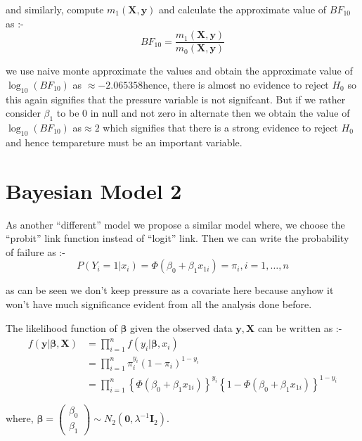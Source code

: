 \documentclass[11pt,english]{article}\usepackage[]{graphicx}\usepackage[]{xcolor}
\begin{document}
and similarly, compute $m_{1}\left(\boldsymbol{X,y}\right)$ and calculate
the approximate value of $BF_{10}$ as :-
\[
BF_{10}=\frac{m_{1}\left(\boldsymbol{X,y}\right)}{m_{0}\left(\boldsymbol{X,y}\right)}
\]

we use naive monte approximate the values and obtain the approximate
value of $\log_{10}\left(BF_{10}\right)$ as $\approx-2.065358$hence,
there is almost no evidence to reject $H_{0}$ so this again signifies
that the pressure variable is not signifcant. But if we rather consider
$\beta_{1}$ to be $0$ in null and not zero in alternate then we
obtain the value of $\log_{10}\left(BF_{10}\right)$ as$\approx2$
which signifies that there is a strong evidence to reject $H_{0}$
and hence tempareture must be an important variable.
\author{\pagebreak}

\section*{Bayesian Model 2}

As another ``different'' model we propose a similar model where,
we choose the ``probit'' link function instead of ``logit'' link.
Then we can write the probability of failure as :-
\[
P\left(Y_{i}=1|x_{i}\right)=\Phi\left(\beta_{0}+\beta_{1}x_{1i}\right)=\pi_{i},i=1,\dots,n
\]

as can be seen we don't keep pressure as a covariate here because
anyhow it won't have much significance evident from all the analysis
done before.

The likelihood function of $\boldsymbol{\beta}$ given the observed
data $\boldsymbol{y,X}$ can be written as :-
\begin{align*}
f\left(\boldsymbol{y}|\boldsymbol{\beta},\boldsymbol{X}\right) & =\prod_{i=1}^{n}f\left(y_{i}|\boldsymbol{\beta},x_{i}\right)\\
 & =\prod_{i=1}^{n}\pi_{i}^{y_{i}}\left(1-\pi_{i}\right)^{1-y_{i}}\\
 & =\prod_{i=1}^{n}\left\{ \Phi\left(\beta_{0}+\beta_{1}x_{1i}\right)\right\} ^{y_{i}}\left\{ 1-\Phi\left(\beta_{0}+\beta_{1}x_{1i}\right)\right\} ^{1-y_{i}}
\end{align*}

where, $\boldsymbol{\beta}=\begin{pmatrix}\beta_{0}\\
\beta_{1}
\end{pmatrix}\sim N_{2}\left(\boldsymbol{0},\lambda^{-1}\boldsymbol{I}_{2}\right)$.
\end{document}
